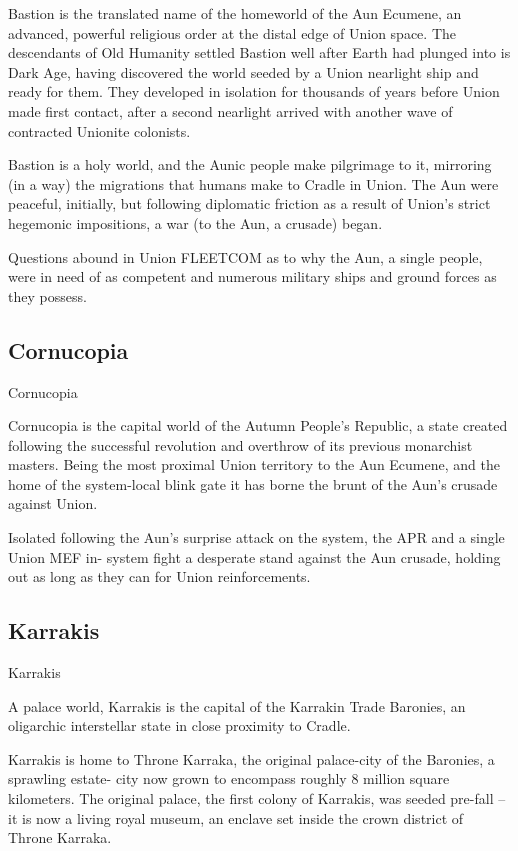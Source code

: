Bastion is the translated name of the homeworld of the Aun Ecumene, an advanced, powerful  
religious order at the distal edge of Union space. The descendants of Old Humanity settled  
Bastion well after Earth had plunged into is Dark Age, having discovered the world seeded by a  
Union nearlight ship and ready for them. They developed in isolation for thousands of years  
before Union made first contact, after a second nearlight arrived with another wave of contracted  
Unionite colonists. 
 

Bastion is a holy world, and the Aunic people make pilgrimage to it, mirroring (in a way) the  
migrations that humans make to Cradle in Union. The Aun were peaceful, initially, but following  
diplomatic friction as a result of Union’s strict hegemonic impositions, a war (to the Aun, a  
crusade) began. 
 

Questions abound in Union FLEETCOM as to why the Aun, a single people, were in need of as  
competent and numerous military ships and ground forces as they possess.   
 
\subsection{Cornucopia}
Cornucopia  
   
Cornucopia is the capital world of the Autumn People’s Republic, a state created following the  
successful revolution and overthrow of its previous monarchist masters. Being the most proximal  
Union territory to the Aun Ecumene, and the home of the system-local blink gate it has borne the  
brunt of the Aun’s crusade against Union.  
 

Isolated following the Aun’s surprise attack on the system, the APR and a single Union MEF in- 
system fight a desperate stand against the Aun crusade, holding out as long as they can for  
Union reinforcements. 
 
\subsection{Karrakis}
Karrakis  

A palace world, Karrakis is the capital of the Karrakin Trade Baronies, an oligarchic interstellar  
state in close proximity to Cradle.   

Karrakis is home to Throne Karraka, the original palace-city of the Baronies, a sprawling estate- 
city now grown to encompass roughly 8 million square kilometers. The original palace, the first  
colony of Karrakis, was seeded pre-fall -- it is now a living royal museum, an enclave set inside  
the crown district of Throne Karraka.    

